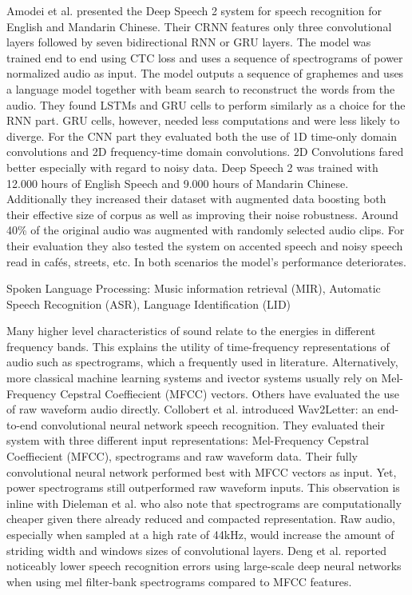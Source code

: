Amodei et al. presented the Deep Speech 2 system for speech recognition for English and Mandarin Chinese. Their CRNN features only three convolutional layers followed by seven bidirectional RNN or GRU layers. The model was trained end to end using CTC loss and uses a sequence of spectrograms of power normalized audio as input. The model outputs a sequence of graphemes and uses a language model together with beam search to reconstruct the words from the audio. They found LSTMs and GRU cells to perform similarly as a choice for the RNN part. GRU cells, however, needed less computations and were less likely to diverge. For the CNN part they evaluated both the use of 1D time-only domain convolutions and 2D frequency-time domain convolutions. 2D Convolutions fared better especially with regard to noisy data. 
Deep Speech 2 was trained with 12.000 hours of English Speech and 9.000 hours of Mandarin Chinese. Additionally they increased their dataset with augmented data boosting both their effective size of corpus as well as improving their noise robustness. Around 40\% of the original audio was augmented with randomly selected audio clips. For their evaluation they also tested the system on accented speech and noisy speech read in cafés, streets, etc. In both scenarios the model's performance deteriorates.



Spoken Language Processing:
Music information retrieval (MIR), Automatic Speech Recognition (ASR), Language Identification (LID)

Many higher level characteristics of sound relate to the energies in different frequency bands. This explains the utility of time-frequency representations of audio such as spectrograms, which a frequently used in literature.\cite{montavon2009deep, dieleman2013, multiscalelee2009unsupervised, wulfing2012unsupervised, henaff2011unsupervised} Alternatively, more classical machine learning systems and ivector systems usually rely on Mel-Frequency Cepstral Coeffiecient (MFCC) vectors. \cite{} Others have evaluated the use of raw waveform audio directly.\cite{dieleman2014end, collobert2016wav2letter}
Collobert et al. introduced Wav2Letter\cite{collobert2016wav2letter}: an end-to-end convolutional neural network speech recognition. They evaluated their system with three different input representations: Mel-Frequency Cepstral Coeffiecient (MFCC), spectrograms and raw waveform data. Their fully convolutional neural network performed best with MFCC vectors as input. Yet, power spectrograms still outperformed raw waveform inputs. This observation is inline with Dieleman et al.\cite{dieleman2014end} who also note that spectrograms are computationally cheaper given there already reduced and compacted representation. Raw audio, especially when sampled at a high rate of 44kHz, would increase the amount of striding width and windows sizes of convolutional layers.  
Deng et al. \cite{deng2013recent} reported noticeably lower speech recognition errors using large-scale deep neural networks when using mel filter-bank spectrograms compared to MFCC features. 



